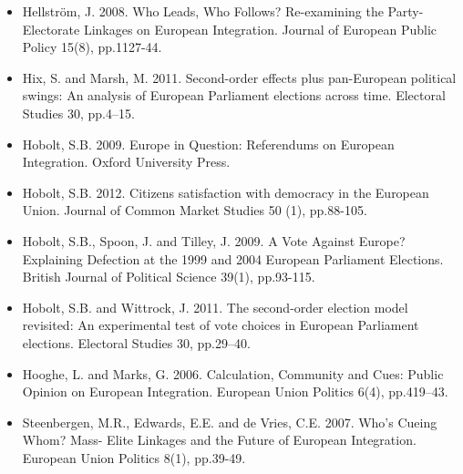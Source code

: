 \begin{itemize}
	\item Hellstr{\"o}m, J. 2008. Who Leads, Who Follows? Re-examining the Party-Electorate Linkages on European Integration. Journal of European Public Policy 15(8), pp.1127-44.
	\item Hix, S. and Marsh, M. 2011. Second-order effects plus pan-European political swings: An analysis of European Parliament elections across time. Electoral Studies 30, pp.4–15.
	\item Hobolt, S.B. 2009. Europe in Question: Referendums on European Integration. Oxford University Press.
	\item Hobolt, S.B. 2012. Citizens satisfaction with democracy in the European Union. Journal of Common Market Studies 50 (1), pp.88-105.
	\item Hobolt, S.B., Spoon, J. and Tilley, J. 2009. A Vote Against Europe? Explaining Defection at the 1999 and 2004 European Parliament Elections. British Journal of Political Science 39(1), pp.93-115.
	\item Hobolt, S.B. and Wittrock, J. 2011. The second-order election model revisited: An experimental test of vote choices in European Parliament elections. Electoral Studies 30, pp.29–40.
	\item Hooghe, L. and Marks, G. 2006. Calculation, Community and Cues: Public Opinion on European Integration. European Union Politics 6(4), pp.419–43.
	\item Steenbergen, M.R., Edwards, E.E. and de Vries, C.E. 2007. Who’s Cueing Whom? Mass- Elite Linkages and the Future of European Integration. European Union Politics 8(1), pp.39-49.
\end{itemize}